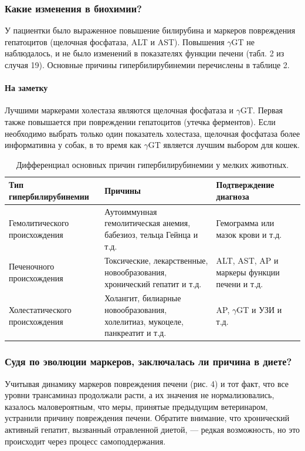 \documentclass[a4paper,12pt]{book}
\begin{document}
\subsubsection*{Какие изменения в биохимии?}
У пациентки было выраженное повышение билирубина и маркеров повреждения гепатоцитов (щелочная фосфатаза, ALT и AST). Повышения $\gamma$GT не наблюдалось, и не было изменений в показателях функции печени (табл. 2 из случая 19). Основные причины гипербилирубинемии перечислены в таблице 2.

\paragraph{На заметку}
Лучшими маркерами холестаза являются щелочная фосфатаза и $\gamma$GT. Первая также повышается при повреждении гепатоцитов (утечка ферментов). Если необходимо выбрать только один показатель холестаза, щелочная фосфатаза более информативна у собак, в то время как $\gamma$GT является лучшим выбором для кошек.

\begin{table}[htbp]
\centering
\caption{Дифференциал основных причин гипербилирубинемии у мелких животных.}
\begin{tabular}{p{4cm}p{6cm}p{4cm}}
\toprule
Тип гипербилирубинемии & Причины & Подтверждение диагноза \\
\midrule
Гемолитического происхождения & Аутоиммунная гемолитическая анемия, бабезиоз, тельца Гейнца и т.д. & Гемограмма или мазок крови и т.д. \\
Печеночного происхождения & Токсические, лекарственные, новообразования, хронический гепатит и т.д. & ALT, AST, AP и маркеры функции печени и т.д. \\
Холестатического происхождения & Холангит, билиарные новообразования, холелитиаз, мукоцеле, панкреатит и т.д. & AP, $\gamma$GT и УЗИ и т.д. \\
\bottomrule
\end{tabular}
\end{table}

\subsubsection*{Судя по эволюции маркеров, заключалась ли причина в диете?}
Учитывая динамику маркеров повреждения печени (рис. 4) и тот факт, что все уровни трансаминаз продолжали расти, а их значения не нормализовались, казалось маловероятным, что меры, принятые предыдущим ветеринаром, устранили причину повреждения печени. Обратите внимание, что хронический активный гепатит, вызванный отравленной диетой, — редкая возможность, но это происходит через процесс самоподдержания.
\end{document}
